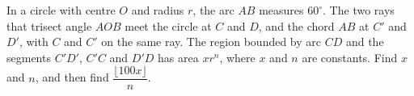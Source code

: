 In a circle with centre $O$ and radius $r$, the arc $AB$ measures $60^\circ$. The two rays that trisect angle $AOB$ meet the circle at $C$ and $D$, and the chord $AB$ at $C'$ and $D'$, with $C$ and $C'$ on the same ray. The region bounded by arc $CD$ and the segments $C'D'$, $C'C$ and $D'D$ has area $xr^n$, where $x$ and $n$ are constants. Find $x$ and $n$, and then find $\dfrac{\lfloor100x\rfloor}{n}$.
